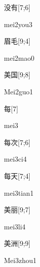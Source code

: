 \begin{verbete}{没有}[7;6]
\begin{pronuncia}{mei2you3}
\end{pronuncia}
\end{verbete}

\begin{verbete}{眉毛}[9;4]
\begin{pronuncia}{mei2mao0}
\end{pronuncia}
\end{verbete}

\begin{verbete}{美国}[9;8]
\begin{pronuncia}{Mei2guo1}
\end{pronuncia}
\end{verbete}

\begin{verbete}[mei3]{每}[7]
\begin{pronuncia}{mei3}
\end{pronuncia}
\end{verbete}

\begin{verbete}[mei3ci4]{每次}[7;6]
\begin{pronuncia}{mei3ci4}
\end{pronuncia}
\end{verbete}

\begin{verbete}{每天}[7;4]
\begin{pronuncia}{mei3tian1}
\end{pronuncia}
\end{verbete}

\begin{verbete}[mei3li4]{美丽}[9;7]
\begin{pronuncia}{mei3li4}
\end{pronuncia}
\end{verbete}

\begin{verbete}{美洲}[9;9]
\begin{pronuncia}{Mei3zhou1}
\end{pronuncia}
\end{verbete}

